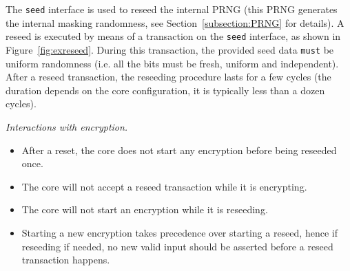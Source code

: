 \documentclass{scrartcl}
\begin{document}
The \texttt{seed} interface is used to reseed the internal PRNG (this
PRNG generates the internal masking randomness, see
Section~\ref{subsection:PRNG} for details).
A reseed is executed by means of a transaction on the \texttt{seed} interface,
as shown in Figure~\ref{fig:exreseed}.
During this transaction, the provided seed data \texttt{must} be uniform
randomness (i.e. all the bits must be fresh, uniform and independent).
After a reseed transaction, the reseeding procedure lasts for a few cycles (the
duration depends on the core configuration, it is typically less than a dozen
cycles). 

\emph{Interactions with encryption.}
\begin{itemize}
    \item After a reset, the core does not start any encryption before being reseeded once.
    \item The core will not accept a reseed transaction while it is encrypting.
    \item The core will not start an encryption while it is reseeding.
    \item Starting a new encryption takes precedence over starting a reseed,
        hence if reseeding if needed, no new valid input should be asserted
        before a reseed transaction happens.
\end{itemize}
\end{document}
